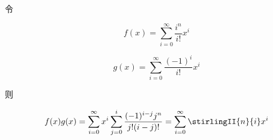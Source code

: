 令

\[
    f(x)=\sum_{i=0}^{\infty}\frac{i^n}{i!}x^i
\]

\[
    g(x)=\sum_{i=0}^{\infty}\frac{(-1)^i}{i!}x^i
\]

则

\[
    f(x)g(x)=\sum_{i=0}^{\infty}x^i\sum_{j=0}^i\frac{(-1)^{i-j}j^n}{j!(i-j)!}=\sum_{i=0}^{\infty}\stirlingII{n}{i}x^i
\]
